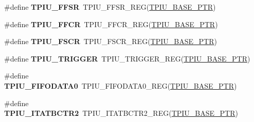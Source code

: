 \begin{DoxyCompactItemize}
\item 
\hypertarget{group___t_p_i_u___register___accessor___macros_ga020c57a36fab7ac79ff2310e34b8d708}{}\#define {\bfseries T\+P\+I\+U\+\_\+\+F\+F\+S\+R}~T\+P\+I\+U\+\_\+\+F\+F\+S\+R\+\_\+\+R\+E\+G(\hyperlink{group___t_p_i_u___peripheral_ga9294dc3ec1881014ac83408db60de6a0}{T\+P\+I\+U\+\_\+\+B\+A\+S\+E\+\_\+\+P\+T\+R})\label{group___t_p_i_u___register___accessor___macros_ga020c57a36fab7ac79ff2310e34b8d708}

\item 
\hypertarget{group___t_p_i_u___register___accessor___macros_gac8a5a5f384ba44b32ca65e20ed86745b}{}\#define {\bfseries T\+P\+I\+U\+\_\+\+F\+F\+C\+R}~T\+P\+I\+U\+\_\+\+F\+F\+C\+R\+\_\+\+R\+E\+G(\hyperlink{group___t_p_i_u___peripheral_ga9294dc3ec1881014ac83408db60de6a0}{T\+P\+I\+U\+\_\+\+B\+A\+S\+E\+\_\+\+P\+T\+R})\label{group___t_p_i_u___register___accessor___macros_gac8a5a5f384ba44b32ca65e20ed86745b}

\item 
\hypertarget{group___t_p_i_u___register___accessor___macros_gaeb0b2f20951ac702dab38f0c3bd6af50}{}\#define {\bfseries T\+P\+I\+U\+\_\+\+F\+S\+C\+R}~T\+P\+I\+U\+\_\+\+F\+S\+C\+R\+\_\+\+R\+E\+G(\hyperlink{group___t_p_i_u___peripheral_ga9294dc3ec1881014ac83408db60de6a0}{T\+P\+I\+U\+\_\+\+B\+A\+S\+E\+\_\+\+P\+T\+R})\label{group___t_p_i_u___register___accessor___macros_gaeb0b2f20951ac702dab38f0c3bd6af50}

\item 
\hypertarget{group___t_p_i_u___register___accessor___macros_ga9a5708414426b57f9a426f0db450e52e}{}\#define {\bfseries T\+P\+I\+U\+\_\+\+T\+R\+I\+G\+G\+E\+R}~T\+P\+I\+U\+\_\+\+T\+R\+I\+G\+G\+E\+R\+\_\+\+R\+E\+G(\hyperlink{group___t_p_i_u___peripheral_ga9294dc3ec1881014ac83408db60de6a0}{T\+P\+I\+U\+\_\+\+B\+A\+S\+E\+\_\+\+P\+T\+R})\label{group___t_p_i_u___register___accessor___macros_ga9a5708414426b57f9a426f0db450e52e}

\item 
\hypertarget{group___t_p_i_u___register___accessor___macros_ga9adb8c73eada72dfb50c571bc27e1c7b}{}\#define {\bfseries T\+P\+I\+U\+\_\+\+F\+I\+F\+O\+D\+A\+T\+A0}~T\+P\+I\+U\+\_\+\+F\+I\+F\+O\+D\+A\+T\+A0\+\_\+\+R\+E\+G(\hyperlink{group___t_p_i_u___peripheral_ga9294dc3ec1881014ac83408db60de6a0}{T\+P\+I\+U\+\_\+\+B\+A\+S\+E\+\_\+\+P\+T\+R})\label{group___t_p_i_u___register___accessor___macros_ga9adb8c73eada72dfb50c571bc27e1c7b}

\item 
\hypertarget{group___t_p_i_u___register___accessor___macros_ga0374a2b7abbfc780f2f8d2688cc52cd8}{}\#define {\bfseries T\+P\+I\+U\+\_\+\+I\+T\+A\+T\+B\+C\+T\+R2}~T\+P\+I\+U\+\_\+\+I\+T\+A\+T\+B\+C\+T\+R2\+\_\+\+R\+E\+G(\hyperlink{group___t_p_i_u___peripheral_ga9294dc3ec1881014ac83408db60de6a0}{T\+P\+I\+U\+\_\+\+B\+A\+S\+E\+\_\+\+P\+T\+R})\label{group___t_p_i_u___register___accessor___macros_ga0374a2b7abbfc780f2f8d2688cc52cd8}


\end{DoxyCompactItemize}
